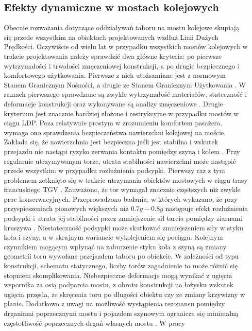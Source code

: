 

\subsection{Efekty dynamiczne w mostach kolejowych} \label{sect:railway_dynamic_effects}
Obecnie rozważania dotyczące oddziaływań taboru na mostu kolejowe skupiają się przede wszystkim na obiektach projektowanych wzdłuż Linii Dużych Prędkości. Oczywiście od wielu lat w przypadku wszystkich mostów kolejowych w trakcie projektowania należy sprawdzić dwa główne kryteria: po pierwsze wytrzymałości i trwałości zmęczeniowej konstrukcji, a po drugie bezpiecznego i komfortowego użytkowania. Pierwsze z nich utożsamiane jest z normowym Stanem Granicznym Nośności, a drugie ze Stanem Granicznym Użytkowania \parencite{PKNc}. W ramach pierwszego sprawdzane są zwykle wytrzymałość materiałów, stateczność i deformacje konstrukcji oraz wykonywane są analizy zmęczeniowe \parencite{Ladislav2008}. Drugie kryterium jest znacznie bardziej złożone i restrykcyjne w przypadku mostów w ciągu LDP. Poza relatywnie prostym w zrozumieniu komfortem pasażera, wymaga ono sprawdzenia bezpieczeństwa nawierzchni kolejowej na moście. Zakłada się, że nawierzchnia jest bezpieczna jeśli jest stabilna i wskutek przejazdu nie nastąpi ryzyko zerwania kontaktu pomiędzy szyną i kołem \parencite{Ramondenc2008}. Przy regularnie utrzymywanym torze, utrata stabilności nawierzchni może nastąpić przede wszystkim w przypadku rozluźnienia podsypki. Pierwszy raz z tym problemem zetknięto się w trakcie utrzymania obiektów mostowych w ciągu trasy francuskiego TGV \parencite{Ramondenc1998}. Zauważono, że tor wymagał znacznie częstszych niż zwykle prac konserwacyjnych. Przeprowadzono badania, w których wykazano, że przy przyspieszeniach pionowych większych niż $0.7g-0.8g$ następuje efekt rozluźnienia podsypki i utrata jej stabilności przez zmniejszenie sił tarcia pomiędzy ziarnami kruszywa \parencite{Zacher2008}. Niestateczność podsypki może skutkować zmniejszeniem siły w styku koła i szyny, a w skrajnym wariancie wykolejeniem się pociągu. Kolejnym czynnikiem mogącym wpłynąć na zaburzenie styku koła z szyną są zmiany geometrii toru wywołane przejazdem taboru po obiekcie. W zależności od typu konstrukcji, schematu statycznego, liczby torów zagadnienie to może różnić się stopniem skomplikowania. Niebezpieczne deformacje mogą wynikać z ugięcia wspornika za osią podparcia mostu, z obrotu konstrukcji na łożysku wskutek ugięcia przęsła, ze skręcenia toru po długości obiektu czy ze zmiany krzywizny w planie. Dodatkowo z uwagi na możliwość wystąpienia rezonansu pomiędzy drganiami poprzecznymi mostu i pojazdem szynowym ogranicza się minimalną częstotliwość poprzecznych drgań własnych mostu \parencite{Goicolea2003,Dias2007,Dias2008}. W pracy 
